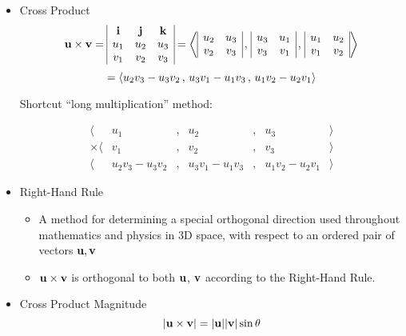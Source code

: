\begin{itemize}
\begin{itemize}
      \end{itemize}
    \item Cross Product
\[
    \mathbf{u} \times \mathbf{v} = 
\begin{array}{|c c c|}
\mathbf{i} & \mathbf{j} & \mathbf{k} \\
u_1 & u_2 & u_3 \\
v_1 & v_2 & v_3 \\
\end{array}
    =
    \left<
\begin{array}{|c c|}
u_2 & u_3 \\
v_2 & v_3 \\
\end{array}
    \,,\,
\begin{array}{|c c|}
u_3 & u_1 \\
v_3 & v_1 \\
\end{array}
    \,,\,
\begin{array}{|c c|}
u_1 & u_2 \\
v_1 & v_2 \\
\end{array}
    \right>
\]
    \[
    =
    \left<u_2v_3-u_3v_2\,,\,u_3v_1-u_1v_3\,,\,u_1v_2-u_2v_1\right>
    \]
    
    Shortcut ``long multiplication'' method:
    
    \[
\begin{array}{rcccccl}
\langle& u_1 & , & u_2 & , & u_3 & \rangle \\
\times\langle & v_1 & , & v_2 & , & v_3 & \rangle \\\hline
\langle & u_2v_3-u_3v_2 & , & u_3v_1-u_1v_3 & , & u_1v_2-u_2v_1 & \rangle
\end{array}
    \]

    \item Right-Hand Rule
      \begin{itemize}
      \item A method for determining a special orthogonal direction used throughout mathematics and physics in 3D space, with respect to an ordered pair of vectors $\mathbf{u},\mathbf{v}$
      \item $\mathbf{u}\times\mathbf{v}$ is orthogonal to both $\mathbf{u}$, $\mathbf{v}$ according to the Right-Hand Rule.
      \end{itemize}

    \newpage

    \item Cross Product Magnitude
      \[|\mathbf{u}\times\mathbf{v}|=|\mathbf{u}||\mathbf{v}|\sin\theta\]


\end{itemize}
